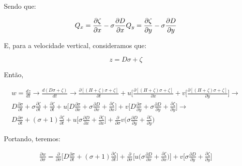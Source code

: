 \documentclass[11pt]{article}
\begin{document}
Sendo que:

\begin{equation}
    Q_x = \frac{\partial{\zeta}}{\partial{x}} - \sigma \frac{\partial{D}}{\partial{x}} \\
    Q_y = \frac{\partial{\zeta}}{\partial{y}} - \sigma \frac{\partial{D}}{\partial{y}} \\
\end{equation}

E, para a velocidade vertical, consideramos que:

\begin{equation}
    z = D\sigma + \zeta
\end{equation}

Então,

\begin{equation}
  \begin{aligned}
  w = \frac{dz}{dt} \rightarrow \frac{d(D\sigma + \zeta)}{dt} \rightarrow
  \frac{\partial{[(H + \zeta)\sigma + \zeta]}}{\partial{t}} + u\bigg[ \frac{\partial{[(H + \zeta)\sigma + \zeta]}}{\partial{x}} + v\bigg[ \frac{\partial{[(H + \zeta)\sigma + \zeta]}}{\partial{y}} \bigg] \rightarrow
  \\
  D\frac{\partial{\sigma}}{\partial{t}} + \sigma\frac{\partial{\zeta}}{\partial{t}} + \frac{\partial{\zeta}}{\partial{t}} + u\bigg[ D\frac{\partial{\sigma}}{\partial{x}} + \sigma\frac{\partial{D}}{\partial{x}} +
  \frac{\partial{\zeta}}{\partial{x}} \bigg] + v\bigg[ D\frac{\partial{\sigma}}{\partial{y}} + \sigma\frac{\partial{D}}{\partial{y}} + \frac{\partial{\zeta}}{\partial{y}} \bigg] \rightarrow
  \\
  D\frac{\partial{\sigma}}{\partial{t}} + (\sigma + 1)\frac{\partial{\zeta}}{\partial{t}} + u\bigg[ \sigma\frac{\partial{D}}{\partial{x}} + \frac{\partial{\zeta}}{\partial{x}} \bigg] +
  \frac{\partial}{\partial{\sigma}}v\bigg( \sigma\frac{\partial{D}}{\partial{y}} + \frac{\partial{\zeta}}{\partial{y}} \bigg)
  \label{eq:3.11}
  \end{aligned}
\end{equation}

Portando, teremos:

\begin{equation}
  \begin{aligned}
  \frac{\partial{w}}{\partial{\sigma}} = \frac{\partial}{\partial{\sigma}}\bigg[ D\frac{\partial{\sigma}}{\partial{t}} + (\sigma + 1)\frac{\partial{\zeta}}{\partial{t}} \bigg] +
  \frac{\partial}{\partial{\sigma}}\bigg[ u\bigg( \sigma\frac{\partial{D}}{\partial{x}} + \frac{\partial{\zeta}}{\partial{x}} \bigg) \bigg]+ v\bigg[ \sigma\frac{\partial{D}}{\partial{y}} +
  \frac{\partial{\zeta}}{\partial{y}} \bigg]
  \label{eq:3.12}
  \end{aligned}
\end{equation}
\end{document}
